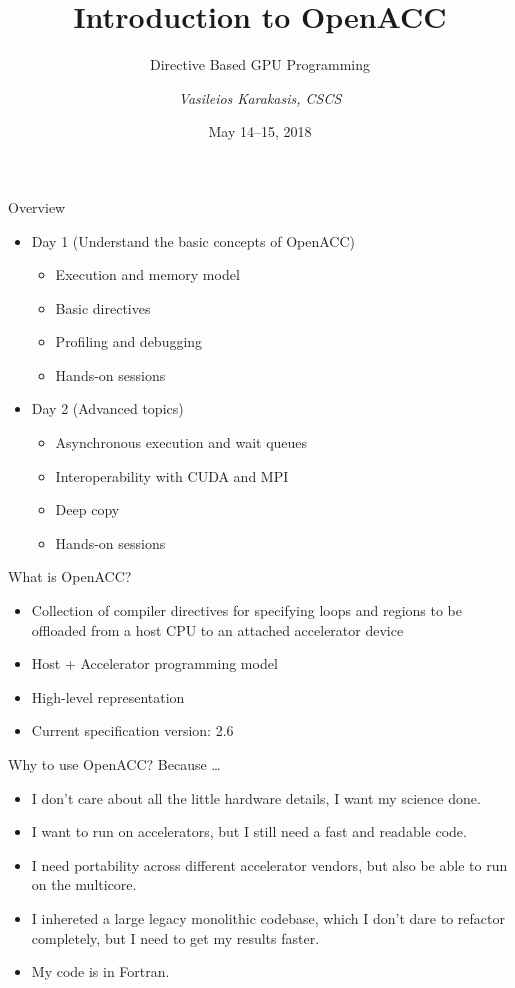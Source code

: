 \documentclass[12pt,aspectratio=169]{beamer}
\author{\emph{Vasileios Karakasis, CSCS}}
\title{Introduction to OpenACC}
\subtitle{Directive Based GPU Programming}
\date{May 14--15, 2018}
\begin{document}
\cscstitle

\begin{frame}{Overview}
  \begin{itemize}
  \item Day 1 (Understand the basic concepts of OpenACC)
    \begin{itemize}
    \item Execution and memory model
    \item Basic directives
    \item Profiling and debugging
    \item Hands-on sessions
    \end{itemize}
    \vspace\baselineskip
  \item Day 2 (Advanced topics)
    \begin{itemize}
    \item Asynchronous execution and wait queues
    \item Interoperability with CUDA and MPI
    \item Deep copy
    \item Hands-on sessions
    \end{itemize}
  \end{itemize}
\end{frame}

\begin{frame}{What is OpenACC?}
  \begin{itemize}
  \item Collection of compiler directives for specifying loops and regions to be
    offloaded from a host CPU to an attached accelerator device
  \item Host + Accelerator programming model
  \item High-level representation
  \item Current specification version: 2.6
  \end{itemize}
\end{frame}

\begin{frame}{Why to use OpenACC?}
  Because \dots
  \vspace\baselineskip
  \begin{itemize}
  \item I don't care about all the little hardware details, I want my science done.
  \item I want to run on accelerators, but I still need a fast and readable code.
  \item I need portability across different accelerator vendors, but also be able to run on the multicore.
  \item I inhereted a large legacy monolithic codebase, which I don't dare to
    refactor completely, but I need to get my results faster.
  \item My code is in Fortran.
  \end{itemize}
\end{frame}
\end{document}
